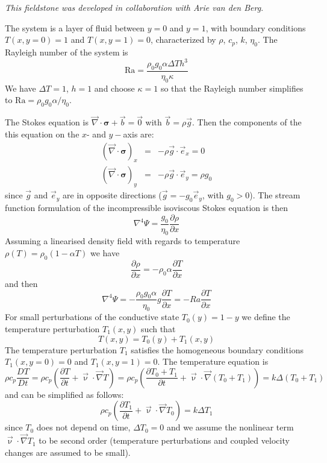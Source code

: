 
{\sl This fieldstone was developed in collaboration with Arie van den Berg}.

The system is a layer of fluid between $y=0$ and $y=1$, with boundary conditions $T(x,y=0)=1$ and $T(x,y=1)=0$, characterized by $\rho$, $c_p$, $k$, $\eta_0$. The Rayleigh number of the system is 
\[
\text{Ra}= \frac{\rho_0 g_0 \alpha \Delta T h^3}{\eta_0 \kappa}
\]
We have $\Delta T=1$, $h=1$ and choose $\kappa=1$ so that the Rayleigh number simplifies to
$\text{Ra}= \rho_0 g_0 \alpha /\eta_0$.

The Stokes equation is $\vec \nabla \cdot \bm \sigma + \vec b = \vec 0$ with $\vec b=\rho \vec g$. 
Then the components of the this equation on the $x$- and $y-$axis are:
\begin{eqnarray}
(\vec \nabla \cdot \bm \sigma)_x &=& - \rho \vec g \cdot \vec e_x = 0\\ 
(\vec \nabla \cdot \bm \sigma)_y &=& - \rho \vec g \cdot \vec e_y = \rho g_0
\end{eqnarray}
since $\vec g$ and $\vec e_y$ are in opposite directions ($\vec g = - g_0 \vec e_y$, with $g_0>0$).
The stream function formulation of the incompressible isoviscous Stokes equation is then
\[
\nabla^4 \Psi= \frac{g_0}{\eta_0}  \frac{\partial \rho}{\partial x} 
\]
Assuming a linearised density field with regards to temperature $\rho(T)=\rho_0 (1-\alpha T)$
we have 
\[
\frac{\partial \rho}{\partial x} 
=
-\rho_0 \alpha \frac{\partial T}{\partial x} 
\]
and then 
\begin{equation}
\boxed{
\nabla^4 \Psi= -\frac{\rho_0 g_0 \alpha}{\eta_0} g \frac{\partial T}{\partial x} 
= -Ra \frac{\partial T}{\partial x} 
}
\end{equation}
For small perturbations of the conductive state $T_0(y)=1-y$ we define the temperature perturbation $T_1(x,y)$ such that 
\[
T(x,y)=T_0(y)+T_1(x,y)
\]
The temperature perturbation $T_1$ satisfies the homogeneous boundary conditions $T_1(x,y=0)=0$ and
$T_1(x,y=1)=0$.
The temperature equation is
\[
\rho c_p \frac{DT}{Dt}
=\rho c_p \left( \frac{\partial T}{\partial t} + {\vec \upnu}\cdot {\vec \nabla} T \right) 
=\rho c_p \left( \frac{\partial T_0+T_1}{\partial t} + {\vec \upnu}\cdot {\vec \nabla} (T_0+T_1) \right) 
= k \Delta (T_0+T_1)
\]
and can be simplified as follows:
\[
\rho c_p \left( \frac{\partial T_1}{\partial t} + {\vec \upnu}\cdot {\vec \nabla} T_0 \right) 
= k \Delta T_1
\]
since $T_0$ does not depend on time, $\Delta T_0=0$ and we assume the nonlinear term ${\vec \upnu}\cdot {\vec \nabla} T_1 $ to be second order (temperature perturbations and coupled velocity changes are assumed to be small).
